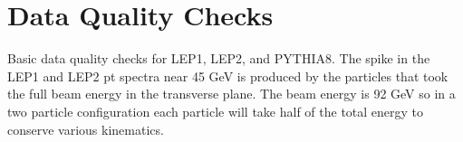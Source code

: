 \section{Data Quality Checks}


Basic data quality checks for LEP1, LEP2, and PYTHIA8. The spike in the LEP1 and LEP2 pt spectra near 45 GeV is produced by the particles that took the full beam energy in the transverse plane. The beam energy is 92 GeV so in a two particle configuration each particle will take half of the total energy to conserve various kinematics. 

